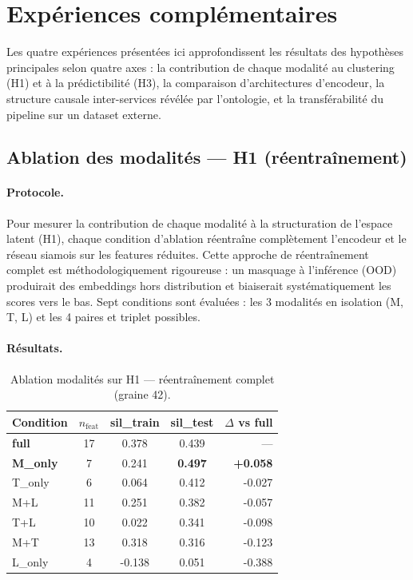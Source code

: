 
\section{Expériences complémentaires}
\label{sec:experiments}

Les quatre expériences présentées ici approfondissent les résultats des hypothèses
principales selon quatre axes : la contribution de chaque modalité au clustering (H1)
et à la prédictibilité (H3), la comparaison d'architectures d'encodeur, la structure
causale inter-services révélée par l'ontologie, et la transférabilité du pipeline
sur un dataset externe.

\subsection{Ablation des modalités --- H1 (réentraînement)}
\label{sec:ablation_h1}

\paragraph{Protocole.}
Pour mesurer la contribution de chaque modalité à la structuration de l'espace latent
(H1), chaque condition d'ablation réentraîne complètement l'encodeur et le réseau siamois
sur les features réduites. Cette approche de réentraînement complet est méthodologiquement
rigoureuse : un masquage à l'inférence (OOD) produirait des embeddings hors distribution
et biaiserait systématiquement les scores vers le bas. Sept conditions sont évaluées :
les 3 modalités en isolation (M, T, L) et les 4 paires et triplet possibles.

\paragraph{Résultats.}

\begin{table}[h]
\centering
\caption{Ablation modalités sur H1 --- réentraînement complet (graine 42).}
\label{tab:ablation_h1}
\begin{tabular}{lcccr}
\toprule
\textbf{Condition} & \textbf{$n_\text{feat}$} & \textbf{sil\_train} & \textbf{sil\_test} & \textbf{$\Delta$ vs full} \\
\midrule
\textbf{full}    & 17 & 0.378 & 0.439 & --- \\
\textbf{M\_only} & 7  & 0.241 & \textbf{0.497} & \textbf{+0.058} \\
T\_only          & 6  & 0.064 & 0.412 & -0.027 \\
M+L              & 11 & 0.251 & 0.382 & -0.057 \\
T+L              & 10 & 0.022 & 0.341 & -0.098 \\
M+T              & 13 & 0.318 & 0.316 & -0.123 \\
L\_only          & 4  & -0.138 & 0.051 & -0.388 \\
\bottomrule
\end{tabular}
\end{table}

